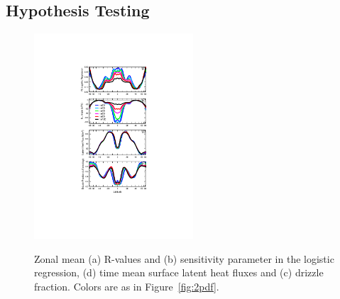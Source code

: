 \documentclass[times]{qjrms4}
\begin{document}
\subsection{Hypothesis Testing}

\begin{figure}
\begin{center}
\noindent\includegraphics[width=14pc,angle=0]{figs/temp_4zonal.pdf}\\
\end{center}
\caption{Zonal mean (a) R-values and (b) sensitivity parameter in the logistic regression, (d) time mean surface latent heat fluxes and (c) drizzle fraction. Colors are as in Figure~\ref{fig:2pdf}.}
\label{fig:4zonal}
\end{figure}
\end{document}
